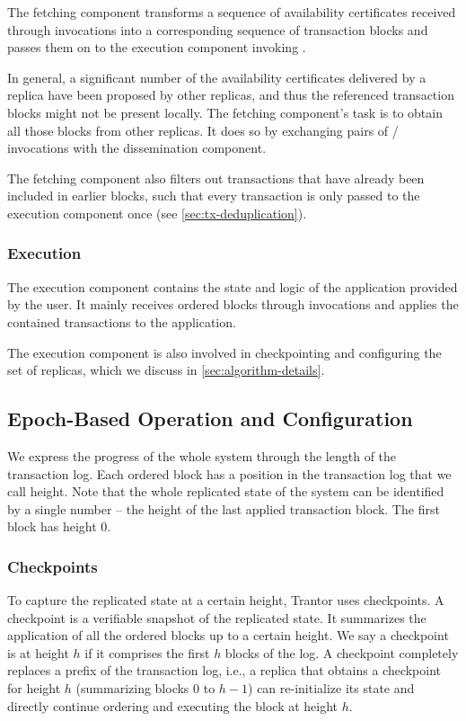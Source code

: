 \documentclass{article}
\begin{document}
The fetching component transforms a sequence of availability certificates received through  invocations
into a corresponding sequence of transaction blocks and passes them on to the execution component invoking .

In general, a significant number of the availability certificates delivered by a replica have been proposed by other replicas,
and thus the referenced transaction blocks might not be present locally.
The fetching component’s task is to obtain all those blocks from other replicas.
It does so by exchanging pairs of  /  invocations with the dissemination component.

The fetching component also filters out transactions that have already been included in earlier blocks,
such that every transaction is only passed to the execution component once (see \cref{sec:tx-deduplication}).

\subsubsection{Execution}

The execution component contains the state and logic of the application provided by the user.
It mainly receives ordered blocks through  invocations and applies the contained transactions to the application.

The execution component is also involved in checkpointing and configuring the set of replicas, which we discuss in \cref{sec:algorithm-details}.

\subsection{Epoch-Based Operation and Configuration}
\label{sec:epochs-and-configuration}

We express the progress of the whole system through the length of the transaction log.
Each ordered block has a position in the transaction log that we call height.
Note that the whole replicated state of the system can be identified by a single number
– the height of the last applied transaction block.
The first block has height 0.

\subsubsection{Checkpoints}

To capture the replicated state at a certain height, Trantor uses checkpoints.
A checkpoint is a verifiable snapshot of the replicated state.
It summarizes the application of all the ordered blocks up to a certain height.
We say a checkpoint is at height $h$ if it comprises the first $h$ blocks of the log.
A checkpoint completely replaces a prefix of the transaction log,
i.e., a replica that obtains a checkpoint for height $h$ (summarizing blocks $0$ to $h-1$)
can re-initialize its state and directly continue ordering and executing the block at height $h$.
\end{document}
